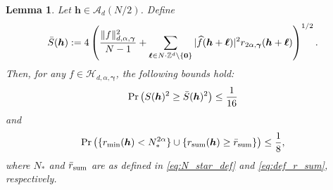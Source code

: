 \documentclass[a4paper,11pt]{article}
\newtheorem{lemma}[theorem]{Lemma}
\newcommand{\bszero}{\boldsymbol{0}}
\newcommand{\bsh}{\boldsymbol{h}}
\newcommand{\bsl}{\boldsymbol{\ell}}
\newcommand{\bsgamma}{\boldsymbol{\gamma}}
\newcommand{\ZZ}{\mathbb{Z}}
\newcommand{\Acal}{\mathcal{A}}
\newcommand{\Hcal}{\mathcal{H}}
\begin{document}
\begin{lemma}\label{lem:goodlattice}
Let $\bsh\in \Acal_d (N/2)$. Define
\begin{equation}\label{eq:def_Sh}
   \Bar{S}(\bsh) := 4\left(
\frac{\|f\|^2_{d,\alpha,\bsgamma}}{N-1} + 
\sum_{\bsl \in N \cdot \ZZ^d \setminus \{\bszero\}} |\widehat{f}(\bsh+\bsl)|^2 r_{2\alpha,\bsgamma}(\bsh+\bsl)
\right)^{1/2}. 
\end{equation}
Then, for any $f \in \Hcal_{d,\alpha,\bsgamma}$, the following bounds hold:
\begin{equation}\label{eqn:Shbound}
  \Pr\left(S(\bsh)^2\ge\Bar{S}(\bsh)^2\right)\leq \frac{1}{16}   
\end{equation}
and 
\[ 
\Pr\left(\{r_{\min}(\bsh)< N^{2\alpha}_*\}\cup \{r_{\mathrm{sum}}(\bsh)\ge \Bar{r}_{\mathrm{sum}}\}\right)\leq \frac{1}{8},
\]
where $N_*$ and $\Bar{r}_{\mathrm{sum}}$ are as defined in \eqref{eq:N_star_def}  and \eqref{eq:def_r_sum}, respectively.
\end{lemma}
\end{document}
